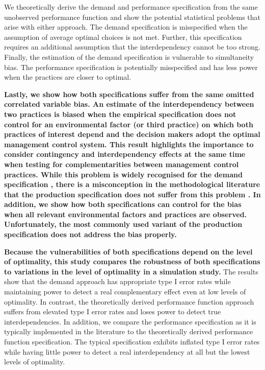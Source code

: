 \documentclass[12pt]{article}
\begin{document}
We theoretically derive the demand and performance specification from the same unobserved performance function and show the potential statistical problems that arise with either approach. The demand specification is misspecified when the assumption of average optimal choices is not met. Further, this specification requires an additional assumption that the interdependency cannot be too strong. Finally, the estimation of the demand specification is vulnerable to simultaneity bias. The performance specification is potentially misspecified and has less power when the practices are closer to optimal.

\textbf{Lastly, we show how both specifications suffer from the same omitted correlated variable bias. An estimate of the interdependency between two practices is biased when the empirical specification does not control for an environmental factor (or third practice) on which both practices of interest depend and the decision makers adopt the optimal management control system. This result highlights the importance to consider contingency and interdependency effects at the same time when testing for complementarities between management control practices. While this problem is widely recognised for the demand specification \citep[\citet{Grabner2013}]{Arora1996}, there is a misconception in the methodological literature that the production specification does not suffer from this problem \citep{Carree2011}. In addition, we show how both specifications can control for the bias when all relevant environmental factors and practices are observed. Unfortunately, the most commonly used variant of the production specification does not address the bias properly.}

\textbf{Because the vulnerabilities of both specifications depend on the level of optimality, this study compares the robustness of both specifications to variations in the level of optimality in a simulation study.} The results show that the demand approach has appropriate type I error rates while maintaining power to detect a real complementary effect even at low levels of optimality. In contrast, the theoretically derived performance function approach suffers from elevated type I error rates and loses power to detect true interdependencies. In addition, we compare the performance specification as it is typically implemented in the literature to the theoretically derived performance function specification. The typical specification exhibits inflated type I error rates while having little power to detect a real interdependency at all but the lowest levels of optimality.
\end{document}
